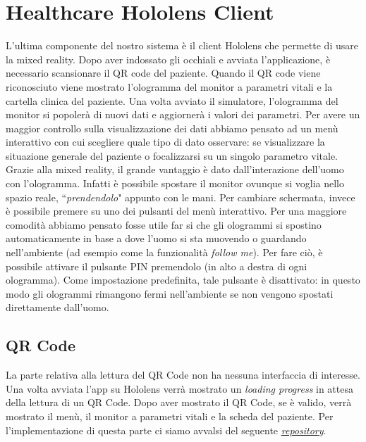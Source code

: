 \section{Healthcare Hololens Client}
L'ultima componente del nostro sistema è il client Hololens che permette di usare la mixed reality. Dopo aver indossato gli occhiali e avviata l'applicazione, è necessario scansionare il QR code del paziente. Quando il QR code viene riconosciuto viene mostrato l'ologramma del monitor a parametri vitali e la cartella clinica del paziente. Una volta avviato il simulatore, l'ologramma del monitor si popolerà di nuovi dati e aggiornerà i valori dei parametri. Per avere un maggior controllo sulla visualizzazione dei dati abbiamo pensato ad un menù interattivo con cui scegliere quale tipo di dato osservare: se visualizzare la situazione generale del paziente o focalizzarsi su un singolo parametro vitale. Grazie alla mixed reality, il grande vantaggio è dato dall'interazione dell'uomo con l'ologramma. Infatti è possibile spostare il monitor ovunque si voglia nello spazio reale, ``\textit{prendendolo}" appunto con le mani. Per cambiare schermata, invece è possibile premere su uno dei pulsanti del menù interattivo. Per una maggiore comodità abbiamo pensato fosse utile far si che gli ologrammi si spostino automaticamente in base a dove l'uomo si sta muovendo o guardando nell'ambiente (ad esempio come la funzionalità \textit{follow me}). Per fare ciò, è possibile attivare il pulsante PIN  premendolo (in alto a destra di ogni ologramma). Come impostazione predefinita, tale pulsante è disattivato: in questo modo gli ologrammi rimangono fermi nell'ambiente se non vengono spostati direttamente dall'uomo.

\subsection{QR Code}
La parte relativa alla lettura del QR Code non ha nessuna interfaccia di interesse. Una volta avviata l'app su Hololens verrà mostrato un \textit{loading progress} in attesa della lettura di un QR Code. Dopo aver mostrato il QR Code, se è valido, verrà mostrato il menù, il monitor a parametri vitali e la scheda del paziente. \newline \newline Per l'implementazione di questa parte ci siamo avvalsi del seguente \href{https://github.com/LocalJoost/QRCodeService}{\textit{repository}}.


